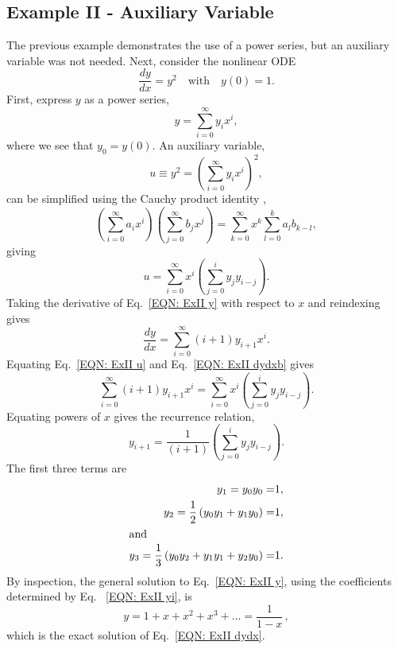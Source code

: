 \documentclass[draft]{agujournal2019}
\begin{document}
\subsection{Example II - Auxiliary Variable}\label{Intro: ExII}
The previous example demonstrates the use of a power series, but an auxiliary variable was not needed. Next, consider the nonlinear ODE
    \begin{equation}\label{EQN: ExII dydx}
        \frac{dy}{dx}=y^2\quad\mbox{with}\quad y(0) =1.
    \end{equation}
First, express $y$ as a power series,
    \begin{equation}\label{EQN: ExII y}
        y=\sum_{i=0}^\infty y_ix^i,   
    \end{equation}
where we see that $y_0=y(0)$. An auxiliary variable, 
    \begin{equation*}
           u \equiv y^2 = \left(\sum_{i=0}^\infty y_i x^i\right)^2,
    \end{equation*} 
can be simplified using the Cauchy product identity \cite{Knuth1997},
    \begin{equation}\label{eqn:cauchy}
        \left(\sum_{i=0}^\infty a_ix^i\right)\left(\sum_{j=0}^\infty b_jx^j\right)=\sum_{k=0}^\infty x^k\sum_{l=0}^{k} a_lb_{k-l},
    \end{equation}
giving
    \begin{equation}\label{EQN: ExII u}   
           u=\sum_{i=0}^\infty  x^i \left(\sum_{j=0}^i y_j y_{i-j}\right).
    \end{equation}      
Taking the derivative of Eq.~\eqref{EQN: ExII y} with respect to $x$ and reindexing gives  
    \begin{equation}\label{EQN: ExII dydxb}
        \frac{dy}{dx}=\sum_{i=0}^\infty (i+1)y_{i+1}x^i.
    \end{equation}
Equating Eq.~\eqref{EQN: ExII u} and Eq.~\eqref{EQN: ExII dydxb} gives
    \begin{equation*}
        \sum_{i=0}^\infty (i+1)y_{i+1}x^i=\sum_{i=0}^\infty x^i\left(\sum_{j=0}^iy_jy_{i-j}\right). 
        \end{equation*}
Equating powers of $x$ gives the recurrence relation,
    \begin{equation}
        y_{i+1}=\frac{1}{(i+1)}\left(\sum_{j=0}^iy_jy_{i-j}\right).\label{EQN: ExII yi}
    \end{equation}
The first three terms are
    \begin{align*}
            y_1=y_0y_0=&1,\\
            y_2=\frac{1}{2}\left(y_0y_1+y_1y_0\right)=&1,\\
     \intertext{and}    
            y_3=\frac{1}{3}\left(y_0y_2+y_1y_1+y_2y_0 \right)=&1.
    \end{align*}
By inspection, the general solution to Eq.~\eqref{EQN: ExII y}, using the coefficients determined by Eq. ~\eqref{EQN: ExII yi}, is 
    \begin{equation*}
        y=1+x+x^2+x^3+\dots=\frac{1}{1-x}\,,
    \end{equation*}
which is the exact solution of Eq.~\eqref{EQN: ExII dydx}. 
\end{document}
